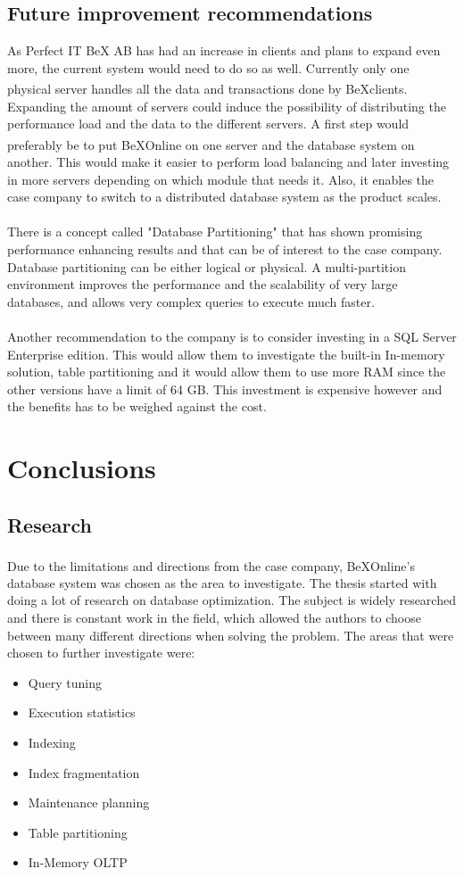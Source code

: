 \documentclass{cslthse-msc}
\newcommand{\bex}{BeX\textsuperscript{\textregistered}}
\begin{document}
\section{Future improvement recommendations}
As Perfect IT BeX AB has had an increase in clients and plans to expand even more, the current system would need to do so as well. Currently only one physical server handles all the data and transactions done by \bex clients. Expanding the amount of servers could induce the possibility of distributing the performance load and the data to the different servers. A first step would preferably be to put \bex Online on one server and the database system on another. This would make it easier to perform load balancing and later investing in more servers depending on which module that needs it. Also, it enables the case company to switch to a distributed database system as the product scales.\\\\
There is a concept called "Database Partitioning" that has shown promising performance enhancing results and that can be of interest to the case company. Database partitioning can be either logical or physical. A multi-partition environment improves the performance and the scalability of very large databases, and allows very complex queries to execute much faster.\\\\
Another recommendation to the company is to consider investing in a SQL Server Enterprise edition. This would allow them to investigate the built-in In-memory solution, table partitioning and it would allow them to use more RAM since the other versions have a limit of 64 GB. This investment is expensive however and the benefits has to be weighed against the cost.

\chapter{Conclusions}\label{sec:conclusions}
\section{Research}
Due to the limitations and directions from the case company, \bex Online's database system was chosen as the area to investigate. The thesis started with doing a lot of research on database optimization. The subject is widely researched and there is constant work in the field, which allowed the authors to choose between many different directions when solving the problem. The areas that were chosen to further investigate were:
\begin{itemize}
\item Query tuning
\item Execution statistics
\item Indexing
\item Index fragmentation
\item Maintenance planning
\item Table partitioning
\item In-Memory OLTP
\end{itemize}
\end{document}
